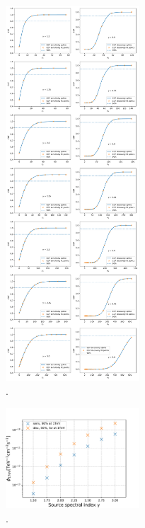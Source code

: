 \begin{figure}
    \centering
    \includegraphics[width=5cm]{Plots/05_csky/9_years_gfu_gold_cdf.pdf}
    \caption{.}
\end{figure}

\begin{figure}
    \centering
    \includegraphics[width=5cm]{Plots/05_csky/time_int_sens_gfu_gold_9_years_new.pdf}
    \caption{.}
\end{figure}

